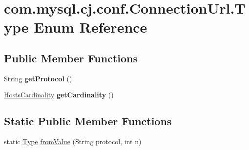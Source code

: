 \hypertarget{enumcom_1_1mysql_1_1cj_1_1conf_1_1_connection_url_1_1_type}{}\section{com.\+mysql.\+cj.\+conf.\+Connection\+Url.\+Type Enum Reference}
\label{enumcom_1_1mysql_1_1cj_1_1conf_1_1_connection_url_1_1_type}
\subsection*{Public Member Functions}
\begin{DoxyCompactItemize}
\item 
\mbox{\label{enumcom_1_1mysql_1_1cj_1_1conf_1_1_connection_url_1_1_type_aabd05e0fe2d3e18e77e0ce8f2267f8be}} 
String {\bfseries get\+Protocol} ()
\item 
\mbox{\label{enumcom_1_1mysql_1_1cj_1_1conf_1_1_connection_url_1_1_type_a7135c7774bf78b325526f17ad12b49fb}} 
\mbox{\hyperlink{enumcom_1_1mysql_1_1cj_1_1conf_1_1_connection_url_1_1_hosts_cardinality}{Hosts\+Cardinality}} {\bfseries get\+Cardinality} ()
\end{DoxyCompactItemize}
\subsection*{Static Public Member Functions}
\begin{DoxyCompactItemize}
\item 
static \mbox{\hyperlink{enumcom_1_1mysql_1_1cj_1_1conf_1_1_connection_url_1_1_type}{Type}} \mbox{\hyperlink{enumcom_1_1mysql_1_1cj_1_1conf_1_1_connection_url_1_1_type_afad2e4b4bcf59858a3b9b1a673c9a837}{from\+Value}} (String protocol, int n)
\end{DoxyCompactItemize}
